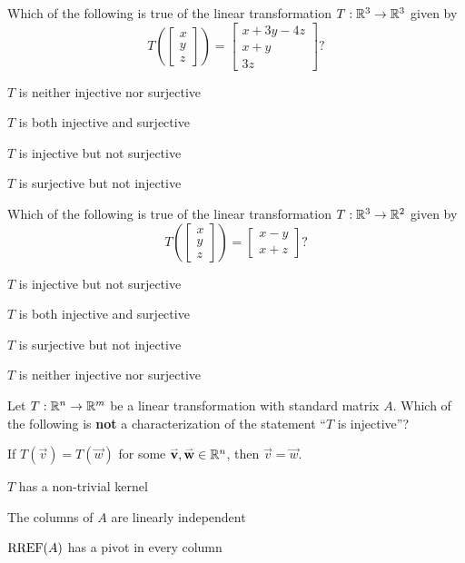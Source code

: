 \begin{readinessAssuranceTest}
\item Which of the following is true of the linear transformation $T: \mathbb{R}^3 \rightarrow \mathbb{R}^3$ given by $$T\left(\begin{bmatrix} x \\ y \\ z \end{bmatrix} \right) = \begin{bmatrix} x+3y-4z \\ x+y \\ 3z \end{bmatrix}?$$
\begin{readinessAssuranceTestChoices}
\item $T$ is neither injective nor surjective
\item $T$ is both injective and surjective %
\item $T$ is injective but not surjective
\item $T$ is surjective but not injective
\end{readinessAssuranceTestChoices}


\item Which of the following is true of the linear transformation $T:\mathbb{R}^3 \rightarrow \mathbb{R}^2$ given by $$T\left(\begin{bmatrix} x \\ y \\ z \end{bmatrix} \right) = \begin{bmatrix} x-y \\ x+z \end{bmatrix} ?$$
\begin{readinessAssuranceTestChoices}
\item $T$ is injective but not surjective
\item $T$ is both injective and surjective
\item $T$ is surjective but not injective %
\item $T$ is neither injective nor surjective
\end{readinessAssuranceTestChoices}


\item Let $T: \mathbb{R}^n \rightarrow \mathbb{R}^m$ be a linear transformation with standard matrix $A$.  Which of the following is {\bf not} a characterization of the statement ``$T$ is injective''?
\begin{readinessAssuranceTestChoices}
\item If $T(\vec{v})=T(\vec{w})$ for some $\mathbf{\accentset{\rightharpoonup}{v}}, \mathbf{\accentset{\rightharpoonup}{w}} \in \mathbb{R}^n$, then $\vec{v}=\vec{w}$.
\item $T$ has a non-trivial kernel %
\item The columns of $A$ are linearly independent
\item $\operatorname{RREF}(A)$ has a pivot in every column
\end{readinessAssuranceTestChoices}



\end{readinessAssuranceTest}
